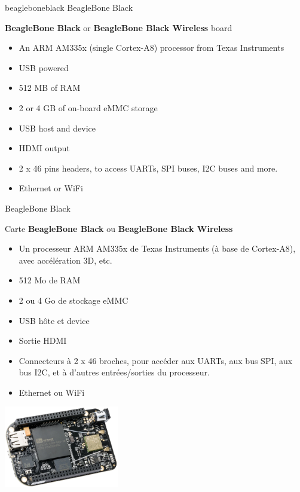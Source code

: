{beagleboneblack}
{BeagleBone Black}
{
  {\bf BeagleBone Black} or {\bf BeagleBone Black Wireless} board
  \vspace{0.5cm}
  \begin{itemize}
  \item An ARM AM335x (single Cortex-A8) processor from Texas
    Instruments
  \item USB powered
  \item 512 MB of RAM
  \item 2 or 4 GB of on-board eMMC storage
  \item USB host and device
  \item HDMI output
  \item 2 x 46 pins headers, to access UARTs, SPI buses, I2C buses
    and more.
  \item Ethernet or WiFi
  \end{itemize}
  \vspace{-0.7cm}
}
{BeagleBone Black}
{
  Carte {\bf BeagleBone Black} ou {\bf BeagleBone Black Wireless}
  \vspace{0.5cm}
  \begin{itemize}
  \item Un processeur ARM AM335x de Texas Instruments (à base de
    Cortex-A8), avec accélération 3D, etc.
  \item 512 Mo de RAM
  \item 2 ou 4 Go de stockage eMMC
  \item USB hôte et device
  \item Sortie HDMI
  \item Connecteurs à 2 x 46 broches, pour accéder aux UARTs, aux bus
    SPI, aux bus I2C, et à d'autres entrées/sorties du processeur.
  \item Ethernet ou WiFi
  \vspace{-0.7cm}
  \end{itemize}
}
{
  \begin{center}
    \includegraphics[width=5cm]{../slides/beagleboneblack-board/beagleboneblack.png}
  \end{center}
}

